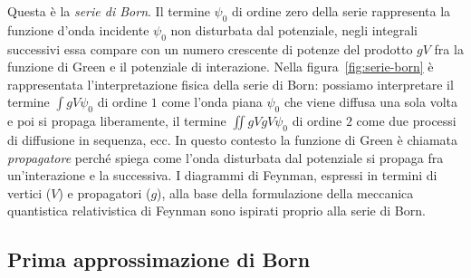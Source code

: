 \documentclass[a4paper,fleqn,twoside,12pt]{article}
\begin{document}
Questa è la \emph{serie di Born}.  Il termine $\psi_{0}$ di ordine zero della
serie rappresenta la funzione d'onda incidente $\psi_{0}$ non disturbata dal
potenziale, negli integrali successivi essa compare con un numero crescente di
potenze del prodotto $gV$ fra la funzione di Green e il potenziale di
interazione.  Nella figura~\ref{fig:serie-born} è rappresentata
l'interpretazione fisica della serie di Born: possiamo interpretare il termine
$\int gV\psi_{0}$ di ordine $1$ come l'onda piana $\psi_{0}$ che viene diffusa
una sola volta e poi si propaga liberamente, il termine $\iint gVgV\psi_{0}$ di
ordine $2$ come due processi di diffusione in sequenza, ecc.  In questo contesto
la funzione di Green è chiamata \emph{propagatore} perché spiega come l'onda
disturbata dal potenziale si propaga fra un'interazione e la successiva.  I
diagrammi di Feynman, espressi in termini di vertici ($V$) e propagatori ($g$),
alla base della formulazione della meccanica quantistica relativistica di
Feynman sono ispirati proprio alla serie di Born.

\subsection{Prima approssimazione di Born}
\label{sec:prima-approx-born}
\end{document}
